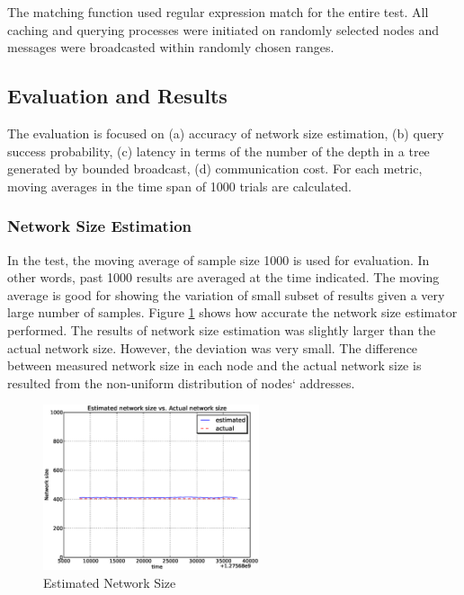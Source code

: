\documentclass[9.5pt,journal,final,finalsubmission,twocolumn]{IEEEtran}
\begin{document}
The matching function used regular expression match for the entire
test.
All caching and querying processes were initiated on randomly selected nodes
and messages were broadcasted within randomly chosen ranges. 

\subsection{Evaluation and Results} \label{plab:result}
The evaluation is focused on (a) accuracy of network size estimation,
(b) query success probability, (c) latency in terms of the number of the depth 
in a tree generated by bounded broadcast, (d) communication cost.
For each metric, moving averages 
in the time span of 1000 trials are calculated.

\subsubsection{Network Size Estimation}
In the test, the moving average of sample 
size 1000 is used for evaluation. 
In other words, past 1000 results are averaged at the time indicated. 
The moving average is good for showing the variation of small subset 
of results given a very large number of samples.
Figure \ref{fig:e_net_size} shows how accurate the network 
size estimator performed.
The results of network size estimation was slightly larger than 
the actual network size. However, the deviation was very small.  
The difference between measured network size in each node and the actual
network size is resulted from the non-uniform distribution of nodes` 
addresses.

\begin{figure}[ht]
\centering
\includegraphics[width=2.5in]{plab_size}
\caption{Estimated Network Size}
\label{fig:e_net_size}
\end{figure}
\end{document}
